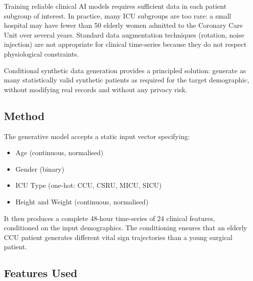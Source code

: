 \documentclass[12pt, a4paper]{article}
\begin{document}
Training reliable clinical AI models requires sufficient data in each patient
subgroup of interest. In practice, many ICU subgroups are too rare:
a small hospital may have fewer than 50 elderly women admitted to the
Coronary Care Unit over several years. Standard data augmentation techniques
(rotation, noise injection) are not appropriate for clinical time-series
because they do not respect physiological constraints.

Conditional synthetic data generation provides a principled solution:
generate as many statistically valid synthetic patients as required for
the target demographic, without modifying real records and without
any privacy risk.

\subsection{Method}

The generative model accepts a static input vector specifying:
\begin{itemize}[itemsep=2pt]
    \item Age (continuous, normalised)
    \item Gender (binary)
    \item ICU Type (one-hot: CCU, CSRU, MICU, SICU)
    \item Height and Weight (continuous, normalised)
\end{itemize}

It then produces a complete 48-hour time-series of 24 clinical features,
conditioned on the input demographics. The conditioning ensures that
an elderly CCU patient generates different vital sign trajectories than
a young surgical patient.

\subsection{Features Used}
\end{document}
